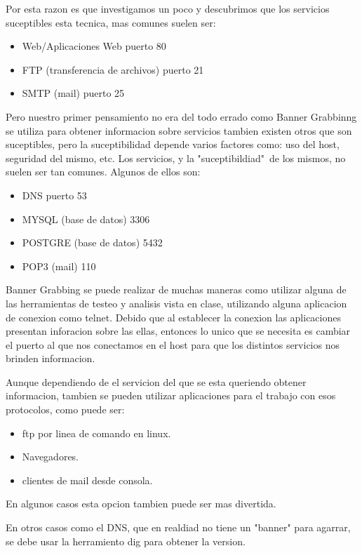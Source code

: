\documentclass[a4paper]{article}
\begin{document}
Por esta razon es que investigamos un poco y descubrimos que  los servicios suceptibles esta tecnica, mas comunes suelen ser:
\begin{itemize}
\item Web/Aplicaciones Web puerto 80
\item FTP (transferencia de archivos) puerto 21
\item SMTP (mail) puerto 25
\end{itemize}


Pero nuestro primer pensamiento no era del todo errado como Banner Grabbinng se utiliza para obtener informacion sobre servicios tambien existen otros que son suceptibles, pero la suceptibilidad depende
varios factores como: uso del host, seguridad del mismo, etc. Los servicios, y la "suceptibildiad"\ de los mismos, no suelen ser tan comunes. Algunos de ellos son:

\begin{itemize}

\item DNS puerto 53
\item MYSQL (base de datos) 3306
\item POSTGRE (base de datos) 5432
\item POP3 (mail) 110

\end{itemize}


Banner Grabbing se puede realizar de muchas maneras como utilizar alguna de las herramientas de testeo y analisis vista en clase, utilizando alguna aplicacion de conexion como telnet. Debido que al 
establecer la conexion las aplicaciones presentan inforacion sobre las ellas, entonces lo unico que se necesita es cambiar el puerto al que nos conectamos en el host para que los distintos servicios nos
brinden informacion.

Aunque dependiendo de el servicion del que se esta queriendo obtener informacion, tambien se pueden utilizar aplicaciones para el trabajo con esos protocolos, como puede ser:
\begin{itemize}
\item ftp por linea de comando en linux.
\item Navegadores.
\item clientes de mail desde consola.
 \end{itemize}
 
 En algunos casos esta opcion tambien puede ser mas divertida.
 
 En otros casos como el DNS, que en realdiad no tiene un "banner" para agarrar, se debe usar la herramiento dig para obtener la version.
 
\end{document}
